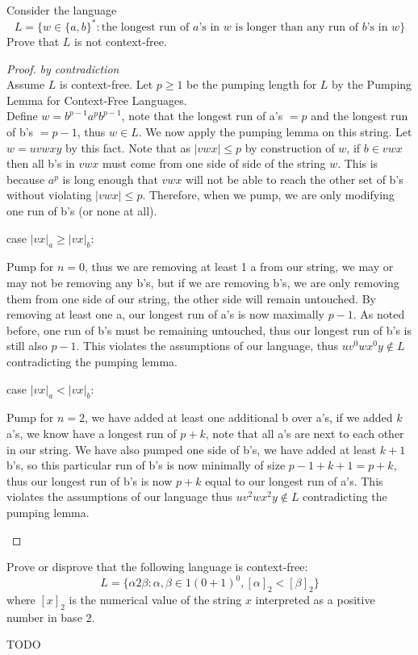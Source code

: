 \documentclass[12pt]{jhwhw}
\begin{document}
	Consider the language
	$$
	L = \{w \in \{a,b\}^* : \text{the longest run of $a$'s in $w$ is longer than any run of $b$'s in $w$}\}
	$$
	Prove that $L$ is not context-free.

\solution

	\begin{proof} \textit{by contradiction} \\
		Assume $L$ is context-free. 
		Let $p\geq 1$ be the pumping length for $L$ by the Pumping Lemma for Context-Free Languages. \\
		Define $w = b^{p-1}a^pb^{p-1}$, note that the longest run of a's $=p$ and the longest run of b's $=p-1$,
		thus $w\in L$. We now apply the pumping lemma on this string.
		Let $w=uvwxy$ by this fact.
		Note that as $|vwx|\leq p$ by construction of $w$, if $b\in vwx$ then all b's in $vwx$ must come
		from one side of side of the string $w$. This is because $a^p$ is long enough that $vwx$ will not
		be able to reach the other set of b's without violating $|vwx|\leq p$.
		Therefore, when we pump, we are only modifying one run of b's (or none at all).

		\bigbreak
		case $|vx|_a \geq |vx|_b$: \\
		\begin{addmargin}[1em]{}
			Pump for $n=0$, thus we are removing at least 1 a from our string, we may or may not be removing
			any b's, but if we are removing b's, we are only removing them from one side of our string, the
			other side will remain untouched. By removing at least one a, our longest run of a's is now maximally
			$p-1$. As noted before, one run of b's must be remaining untouched, thus our longest run of b's is
			still also $p-1$. This violates the assumptions of our language, thus 
			$uv^0wx^0y \not\in L$ contradicting the pumping lemma.
		\end{addmargin}
		case $|vx|_a < |vx|_b$: \\
		\begin{addmargin}[1em]{}
			Pump for $n=2$, we have added at least one additional b over a's, if we added $k$ a's,
			we know have a longest run of $p+k$, note that all a's are next to each other in our string.
			We have also pumped one side of b's, we have added at least $k+1$ b's, so this particular run
			of b's is now minimally of size $p-1+k+1=p+k$, thus our longest run of b's is now $p+k$ equal to our
			longest run of a's. This violates the assumptions of our language thus 
			$uv^2wx^2y \not\in L$ contradicting the pumping lemma.
		\end{addmargin}
		
	\end{proof}

\problem{}

	Prove or disprove that the following language is context-free:
	$$
	L = \{\alpha 2\beta : \alpha,\beta \in 1(0+1)^0, [\alpha]_2 < [\beta]_2\}
	$$
	where $[x]_2$ is the numerical value of the string $x$ interpreted as a positive number in base 2.

\solution

	TODO
\end{document}
